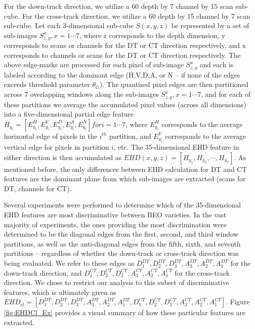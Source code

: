 \documentclass[12pt,dvips]{report}
\numberwithin{equation}{section}
\begin{document}
For the down-track direction, we utilize a 60 depth by 7 channel by 15 scan sub-cube.  For the cross-track direction, we utilize a 60 depth by 15 channel by 7 scan sub-cube.  Let each 3-dimensional sub-cube $S(x,y,z)$  be represented by a set of sub-images $S^{x}_{z,y}, x=1\cdots7$, where z corresponds to the depth dimension, y corresponds to scans or channels for the DT or CT direction respectively, and x corresponds to channels or scans for the DT or CT direction respectively.  The above edge-masks are processed for each pixel of sub-image $S^{x}_{z,y}$ and each is labeled according to the dominant edge (H,V,D,A, or N -- if none of the edges exceeds threshold parameter $\theta_{G}$).  The quantized pixel edges are then partitioned across 7 overlapping windows along the sub-images $S^{x}_{z,y},  x=1\cdots7$, and for each of these partitions we average the accumulated pixel values (across all dimensions) into a five-dimensional partial edge feature $H_{y_{i}}=[E^{H}_{y_{i}},E^{V}_{y_{i}},E^{D}_{y_{i}},E^{A}_{y_{i}},E^{N}_{y_{i}}] for i=1\cdots7$, where $E^{H}_{y_{i}}$ corresponds to the average horizontal edge of pixels in the $i^{th}$ partition, and $E^{V}_{y_{i}}$ corresponds to the average vertical edge for pixels in partition $i$, etc.  The 35-dimensional EHD feature in either direction is then accumulated as $EHD(x,y,z)=[H_{y_{1}},H_{y_{2}},\cdots,H_{y_{7}}]$.  As mentioned before, the only differences between EHD calculation for DT and CT features are the dominant plane from which sub-images are extracted (scans for DT, channels for CT).

Several experiments were performed to determine which of the 35-dimensional EHD features are most discriminative between BEO varieties.  In the vast majority of experiments, the ones providing the most discrimination were determined to be the diagonal edges from the first, second, and third window partitions, as well as the anti-diagonal edges from the fifth, sixth, and seventh partitions -- regardless of whether the down-track or cross-track direction was being evaluated.  We refer to these edges as $D^{DT}_1, D^{DT}_2,D^{DT}_3,A^{DT}_3, A^{DT}_2,A^{DT}_1$ for the down-track direction, and $D^{CT}_1, D^{CT}_2,D^{CT}_3,A^{CT}_3, A^{CT}_2,A^{CT}_1$ for the cross-track direction.   We chose to restrict our analysis to this subset of discriminative features, which is ultimately given as $EHD_{cl}=[D^{DT}_1, D^{DT}_2, D^{DT}_3, A^{DT}_3, A^{DT}_2, A^{DT}_1, D^{CT}_1, D^{CT}_2, D^{CT}_3, A^{CT}_3, A^{CT}_2, A^{CT}_1]$.  Figure \ref{fig:EHDCl_Ex} provides a visual summary of how these particular features are extracted.  
\end{document}
